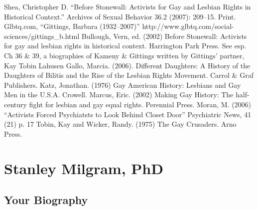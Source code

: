 Shea, Christopher D. ``Before Stonewall: Activists for Gay and Lesbian Rights in Historical Context.'' Archives of Sexual Behavior 36.2 (2007): 209--15. Print.
Glbtq.com, “Gittings, Barbara (1932--2007)” http:\slash \slash www.glbtq.com\slash social-sciences\slash gittings\_b.html
Bullough, Vern, ed. (2002) Before Stonewall: Activists for gay and lesbian rights in historical context. Harrington Park Press. See esp. Ch 36 \& 39, a biographies of Kameny \& Gittings written by Gittings' partner, Kay Tobin Lahusen
Gallo, Marcia. (2006). Different Daughters: A History of the Daughters of Bilitis and the Rise of the Lesbian Rights Movement. Carrol \& Graf Publishers.
Katz, Jonathan. (1976) Gay American History: Lesbians and Gay Men in the U.S.A. Crowell.
Marcus, Eric. (2002) Making Gay History: The half-century fight for lesbian and gay equal rights. Perennial Press.
Moran, M. (2006) “Activists Forced Psychiatsts to Look Behind Closet Door” Psychiatric News, 41 (21) p. 17
Tobin, Kay and Wicker, Randy. (1975) The Gay Crusaders. Arno Press.

\chapter{Stanley Milgram, PhD}
\label{stanleymilgramphd}

\section{Your Biography}
\label{yourbiography}

